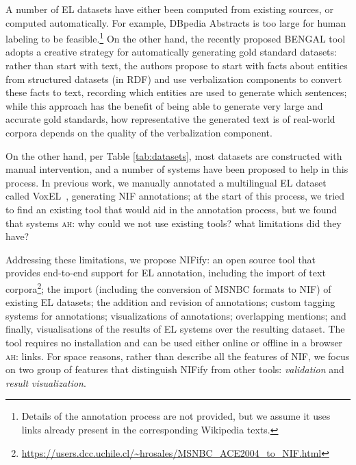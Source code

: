 \documentclass[sigconf]{acmart}
\newcommand{\ah}[1]{{\color{blue}\textsc{ah:} #1}}
\begin{document}
A number of EL datasets have either been computed from existing sources, or computed automatically. For example, DBpedia Abstracts is too large for human labeling to be feasible.\footnote{Details of the annotation process are not provided, but we assume it uses links already present in the corresponding Wikipedia texts.} On the other hand, the recently proposed BENGAL tool~\cite{Bengal2018} adopts a creative strategy for automatically generating gold standard datasets: rather than start with text, the authors propose to start with facts about entities from structured datasets (in RDF) and use verbalization components to convert these facts to text, recording which entities are used to generate which sentences; while this approach has the benefit of being able to generate very large and accurate gold standards, how representative the generated text is of real-world corpora depends on the quality of the verbalization component.
 
On the other hand, per Table \ref{tab:datasets}, most datasets are constructed with manual intervention, and a number of systems have been proposed to help in this process. In previous work, we manually annotated a multilingual EL dataset called VoxEL~\cite{VoxEL2018}, generating NIF annotations; at the start of this process, we tried to find an existing tool that would aid in the annotation process, but we found that systems \ah{why could we not use existing tools? what limitations did they have?}


Addressing these limitations, we propose NIFify: an open source tool that provides end-to-end support for EL annotation, including the import of text corpora\footnote{\url{https://users.dcc.uchile.cl/~hrosales/MSNBC_ACE2004_to_NIF.html}}; the import (including the conversion of MSNBC formats to NIF) of existing EL datasets; the addition and revision of annotations; custom tagging systems for annotations; visualizations of annotations; overlapping mentions; and finally, visualisations of the results of EL systems over the resulting dataset. The tool requires no installation and can be used either online or offline in a browser \ah{links}. For space reasons, rather than describe all the features of NIF, we focus on two group of features that distinguish NIFify from other tools: \textit{validation} and \textit{result visualization}.

\end{document}
